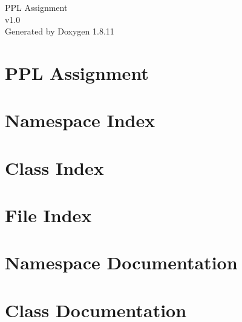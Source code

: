 \documentclass[twoside]{book}
\newcommand{\+}{\discretionary{\mbox{\scriptsize$\hookleftarrow$}}{}{}}
\newcommand{\clearemptydoublepage}{%
  \newpage{\pagestyle{empty}\cleardoublepage}%
}
\begin{document}
\hypersetup{pageanchor=false,
             bookmarksnumbered=true,
             pdfencoding=unicode
            }
\begin{titlepage}
\vspace*{7cm}
\begin{center}%
{\Large P\+PL Assignment \\[1ex]\large v1.\+0 }\\
\vspace*{1cm}
{\large Generated by Doxygen 1.8.11}\\
\end{center}
\end{titlepage}
\clearemptydoublepage
\tableofcontents
\clearemptydoublepage
{}
\hypersetup{pageanchor=true}

\chapter{P\+PL Assignment}
\label{md_README}
\hypertarget{md_README}{}

\chapter{Namespace Index}

\chapter{Class Index}

\chapter{File Index}

\chapter{Namespace Documentation}

\chapter{Class Documentation}











\end{document}
